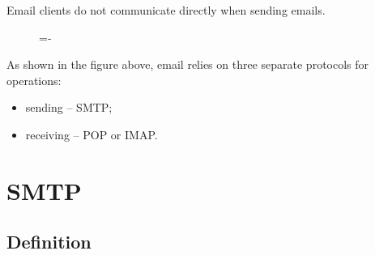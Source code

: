 \documentclass[a4paper]{systems-software}
\begin{document}
Email clients do not communicate directly when sending emails.

\begin{figure}[H]
	\lineskip=-\fboxrule
\end{figure}

As shown in the figure above, email relies on three separate protocols for operations:
\begin{itemize}
	\item sending -- SMTP;
	\item receiving -- POP or IMAP.
\end{itemize}


\newpage

\section*{SMTP}

\subsection*{Definition}
\end{document}
